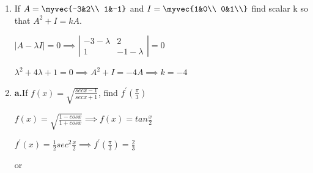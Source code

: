 \begin{enumerate}[label=\thesubsection.\arabic*, ref=\thesubsection.\theenumi]
$\overrightarrow{r}=3\sqrt{3}\left(\pm\frac{1}{\sqrt{3}}\hat{i} \pm\frac{1}{\sqrt{3}}\hat{j} \pm\frac{1}{\sqrt{3}}\hat{k}\right)$ 

\begin{center}
    or
\end{center}


\textbf{b.}Find the angle between unit vectors $\vec{a}$ and $\vec{b}$ so that $\sqrt{3}\vec{a}-\vec{b}$ is also a unit vector.   

\solution


$\vert{}\sqrt{3}\vec{a}-\vec{b}\vert{}=\sqrt{3\vert{a}\vert{}^2 + \vert{b}\vert{}^2 +2\sqrt{3}\left(\vec{a}\cdot\vec{b}\right)}$

$1 = \sqrt{3 + 1 +2\sqrt{3}\left(\vec{a}\cdot\vec{b}\right)}$



$\vec{a}\cdot\vec{b}= -\frac{\sqrt{3}}{2} $

from \eqref{eq:ee26btech11222-prob-19_2}
\begin{align}
 cos\theta = -\frac{\sqrt{3}}{2}
\end{align}
$\implies \theta = \frac{5\pi}{6}$

\item

If $A=\myvec{-3&2\\ 1&-1}$ and $I=\myvec{1&0\\ 0&1\\}$ find scalar k so that $A^{2}+I=kA.$

\solution

$\vert{}A-\lambda I\vert{}= 0 \implies \left|\begin{matrix}
    -3-\lambda & 2\\ 1& -1-\lambda\end{matrix} \right|= 0$

    $\lambda^2+ 4\lambda +1=0 \implies A^2 +I= -4A \implies k=-4$


\item

\textbf{a.}If $f(x) =\sqrt{\frac{secx - 1}{secx + 1}}$, find $f^\prime {(\frac{\pi}{3})}$


\solution

$f(x)= \sqrt{\frac{1-cosx}{1+cosx}} \implies f(x)= tan\frac{x}{2}$

$f^\prime (x) = \frac{1}{2}{sec^2\frac{x}{2}} \implies  f^\prime(\frac{\pi}{3}) = \frac{2}{3}$

\begin{center}
    or 
\end{center}



\end{enumerate}
